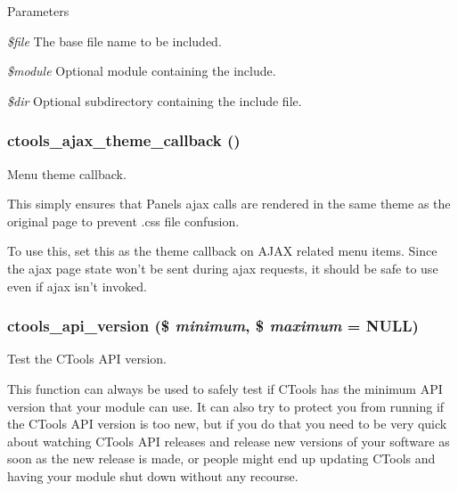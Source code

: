 \begin{DoxyParams}{Parameters}
\item[{\em \$file}]The base file name to be included. \item[{\em \$module}]Optional module containing the include. \item[{\em \$dir}]Optional subdirectory containing the include file. \end{DoxyParams}
\hypertarget{ctools_8module_a270062e67835dc99cc4b57fba5f06289}{
\subsubsection[{ctools\_\-ajax\_\-theme\_\-callback}]{\setlength{\rightskip}{0pt plus 5cm}ctools\_\-ajax\_\-theme\_\-callback ()}}
\label{ctools_8module_a270062e67835dc99cc4b57fba5f06289}
Menu theme callback.

This simply ensures that Panels ajax calls are rendered in the same theme as the original page to prevent .css file confusion.

To use this, set this as the theme callback on AJAX related menu items. Since the ajax page state won't be sent during ajax requests, it should be safe to use even if ajax isn't invoked. \hypertarget{ctools_8module_a68cd3b30d58f60bb475e83662282536c}{
\subsubsection[{ctools\_\-api\_\-version}]{\setlength{\rightskip}{0pt plus 5cm}ctools\_\-api\_\-version (\$ {\em minimum}, \/  \$ {\em maximum} = {\ttfamily NULL})}}
\label{ctools_8module_a68cd3b30d58f60bb475e83662282536c}
Test the CTools API version.

This function can always be used to safely test if CTools has the minimum API version that your module can use. It can also try to protect you from running if the CTools API version is too new, but if you do that you need to be very quick about watching CTools API releases and release new versions of your software as soon as the new release is made, or people might end up updating CTools and having your module shut down without any recourse.

